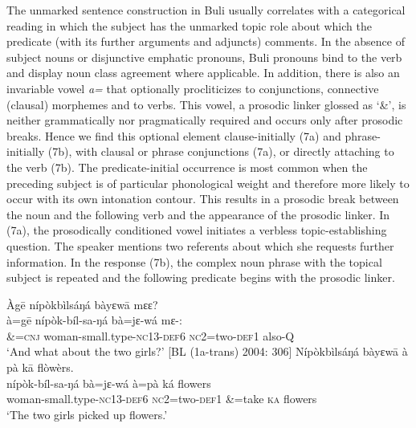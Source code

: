 \documentclass[output=paper]{langsci/langscibook}
\begin{document}
The unmarked sentence construction in Buli usually correlates with a categorical reading in which the subject has the unmarked topic role about which the predicate (with its further arguments and adjuncts) comments. In the absence of subject nouns or disjunctive emphatic pronouns, Buli pronouns bind to the verb and display noun class agreement where applicable. In addition, there is also an invariable vowel \textit{a=} that optionally procliticizes to conjunctions, connective (clausal) morphemes and to verbs. This vowel, a prosodic linker glossed as ‘\&’, is neither grammatically nor pragmatically required and occurs only after prosodic breaks. Hence we find this optional element clause-initially (7a) and phrase-initially (7b), with clausal or phrase conjunctions (7a), or directly attaching to the verb (7b). The predicate-initial occurrence is most common when the preceding subject is of particular phonological weight and therefore more likely to occur with its own intonation contour. This results in a prosodic break between the noun and the following verb and the appearance of the prosodic linker. In (7a), the prosodically conditioned vowel initiates a verbless topic-establishing question. The speaker mentions two referents about which she requests further information. In the response (7b), the complex noun phrase with the topical subject is repeated and the following predicate begins with the prosodic linker.  

\begin{exe}
	\ex\label{schwarz:7a}\begin{xlist}
		\ex  \glll Àg\={e} {nípòkbìlsáŋá}    {bàyɛw\={a}}    {mɛɛ?} \\
			\textup{à=g\={e}}  {nípòk-bíl-sa-ŋá}      {bà=jɛ-wá}    {mɛ-:}\\
			\&=\textsc{cnj}  woman-small.type-\textsc{nc}13-\textsc{def}6  \textsc{nc}2=two-\textsc{def}1  also-\textsc{Q}\\
\glt   ‘And what about the two girls?’ [BL (1a-trans) 2004: 306]
		\ex\glll Nípòkbìlsáŋá  bàyɛw\={a}  {à pà}  k\={a}  flòwèrs.\\
			 nípòk-bíl-sa-ŋá  bà=jɛ-wá  à=pà  ká  flowers\\
			woman-small.type-\textsc{nc}13-\textsc{def}6  \textsc{nc}2=two-\textsc{def}1  \&=take  \textsc{ka}  flowers\\
    \glt ‘The two girls picked up flowers.’ \citep[271]{Schwarz2009}
	\end{xlist}
\end{exe}
\end{document}
